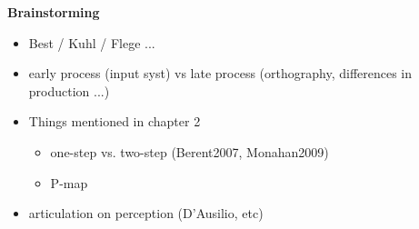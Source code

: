 \textbf{Brainstorming} \\

\begin{itemize}
\item Best / Kuhl / Flege ...
\item early process (input syst) vs late process (orthography, differences in production ...)
\item Things mentioned in chapter 2
  \begin{itemize}
  \item one-step vs. two-step (Berent2007, Monahan2009)
  \item P-map
  \end{itemize}
\item articulation on perception (D'Ausilio, etc)
\end{itemize}

